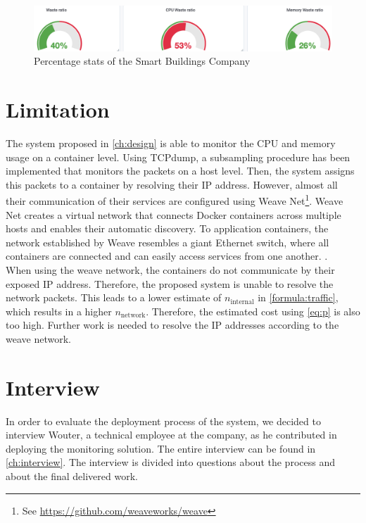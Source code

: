 \begin{figure}
    \centering
    \includegraphics[width=\textwidth]{gfx/stats_percentage.png}
    \caption{Percentage stats of the Smart Buildings Company}
    \label{fig:stats_percentage}
\end{figure}

\section{Limitation} \label{sec:sb-limitation}
The system proposed in \autoref{ch:design} is able to monitor the CPU and memory usage on a container level. Using TCPdump, a subsampling procedure has been implemented that monitors the packets on a host level. Then, the system assigns this packets to a container by resolving their IP address. However, almost all their communication of their services are configured using Weave Net\footnote{See \url{https://github.com/weaveworks/weave}}. Weave Net creates a virtual network that connects Docker containers across multiple hosts and enables their automatic discovery. To application containers, the network established by Weave resembles a giant Ethernet switch, where all containers are connected and can easily access services from one another. \cite{weave}.\\

\noindent
When using the weave network, the containers do not communicate by their exposed IP address. Therefore, the proposed system is unable to resolve the network packets. This leads to a lower estimate of $n_\text{internal}$ in \autoref{formula:traffic}, which results in a higher $n_\text{network}$. Therefore, the estimated cost using \autoref{eq:p} is also too high. Further work is needed to resolve the IP addresses according to the weave network.


\section{Interview} \label{sec:sb-interview}
In order to evaluate the deployment process of the system, we decided to interview Wouter, a technical employee at the company, as he contributed in deploying the monitoring solution. The entire interview can be found in \autoref{ch:interview}. The interview is divided into questions about the process and about the final delivered work.\\


